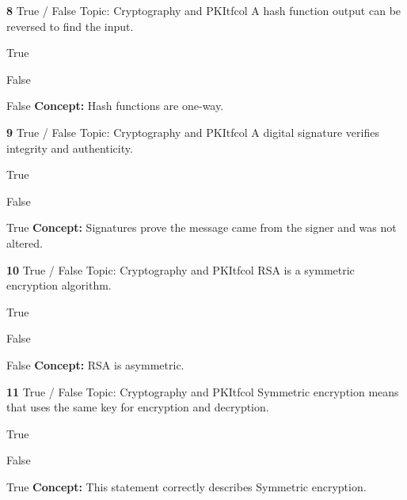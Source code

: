\documentclass[10pt,a4paper]{article}
\begin{document}
\begin{qcard}{\color{white}\textbf{8} \hfill \small True / False \textbar{} Topic: Cryptography and PKI}{tfcol}
A hash function output can be reversed to find the input.

\begin{qoptions}
\item True
\item False
\end{qoptions}
\begin{explainbox}{False}
\textbf{Concept:} Hash functions are one-way.
\end{explainbox}
\end{qcard}

\begin{qcard}{\color{white}\textbf{9} \hfill \small True / False \textbar{} Topic: Cryptography and PKI}{tfcol}
A digital signature verifies integrity and authenticity.

\begin{qoptions}
\item True
\item False
\end{qoptions}
\begin{explainbox}{True}
\textbf{Concept:} Signatures prove the message came from the signer and was not altered.
\end{explainbox}
\end{qcard}

\begin{qcard}{\color{white}\textbf{10} \hfill \small True / False \textbar{} Topic: Cryptography and PKI}{tfcol}
RSA is a symmetric encryption algorithm.

\begin{qoptions}
\item True
\item False
\end{qoptions}
\begin{explainbox}{False}
\textbf{Concept:} RSA is asymmetric.
\end{explainbox}
\end{qcard}

\begin{qcard}{\color{white}\textbf{11} \hfill \small True / False \textbar{} Topic: Cryptography and PKI}{tfcol}
Symmetric encryption means that uses the same key for encryption and decryption.

\begin{qoptions}
\item True
\item False
\end{qoptions}
\begin{explainbox}{True}
\textbf{Concept:} This statement correctly describes Symmetric encryption.
\end{explainbox}
\end{qcard}
\end{document}
